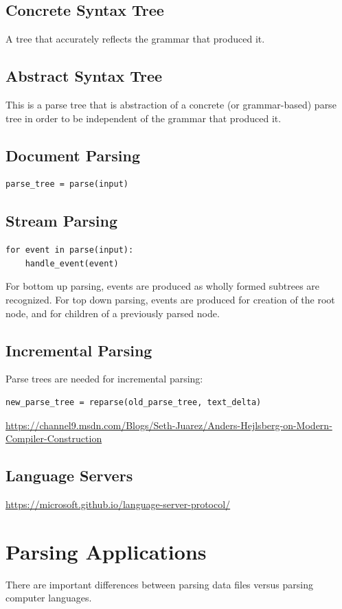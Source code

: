 \documentclass{book}
\begin{document}
\subsection{Concrete Syntax Tree}
A tree that accurately reflects the grammar that produced it.

\subsection{Abstract Syntax Tree}
This is a parse tree that is abstraction of a concrete (or grammar-based) parse tree
in order to be independent of the grammar that produced it.


\subsection{Document Parsing}
\begin{verbatim}
parse_tree = parse(input)
\end{verbatim}

\subsection{Stream Parsing}
\begin{verbatim}
for event in parse(input):
    handle_event(event)
\end{verbatim}

For bottom up parsing, events are produced as wholly formed subtrees are recognized.
For top down parsing, events are produced for creation of the root node, and 
for children of a previously parsed node.

\subsection{Incremental Parsing}
Parse trees are needed for incremental parsing:
\begin{verbatim}
new_parse_tree = reparse(old_parse_tree, text_delta)
\end{verbatim}
\url{https://channel9.msdn.com/Blogs/Seth-Juarez/Anders-Hejlsberg-on-Modern-Compiler-Construction}

\subsection{Language Servers}
\url{https://microsoft.github.io/language-server-protocol/}

\section{Parsing Applications}
There are important differences between parsing 
data files versus parsing computer languages.
\end{document}
